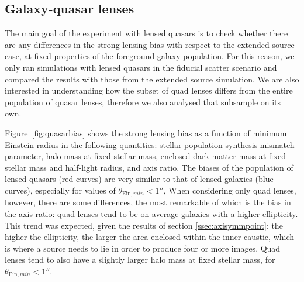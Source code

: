 \documentclass{aa}
\def\Fref#1{Figure~\ref{#1}\xspace}
\begin{document}
\subsection{Galaxy-quasar lenses}\label{ssec:quasarbias}

The main goal of the experiment with lensed quasars is to check whether there are any differences in the strong lensing bias with respect to the extended source case, at fixed properties of the foreground galaxy population.
For this reason, we only ran simulations with lensed quasars in the fiducial scatter scenario and compared the results with those from the extended source simulation.
We are also interested in understanding how the subset of quad lenses differs from the entire population of quasar lenses, therefore we also analysed that subsample on its own.

\Fref{fig:quasarbias} shows the strong lensing bias as a function of minimum Einstein radius in the following quantities: stellar population synthesis mismatch parameter, halo mass at fixed stellar mass, enclosed dark matter mass at fixed stellar mass and half-light radius, and axis ratio.
The biases of the population of lensed quasars (red curves) are very similar to that of lensed galaxies (blue curves), especially for values of $\theta_{\mathrm{Ein},min}<1''$, 
When considering only quad lenses, however, there are some differences, the most remarkable of which is the bias in the axis ratio: quad lenses tend to be on average galaxies with a higher ellipticity.
This trend was expected, given the results of section \ref{ssec:axisymmpoint}: the higher the ellipticity, the larger the area enclosed within the inner caustic, which is where a source needs to lie in order to produce four or more images.
Quad lenses tend to also have a slightly larger halo mass at fixed stellar mass, for $\theta_{\mathrm{Ein},min}<1''$.
\end{document}
